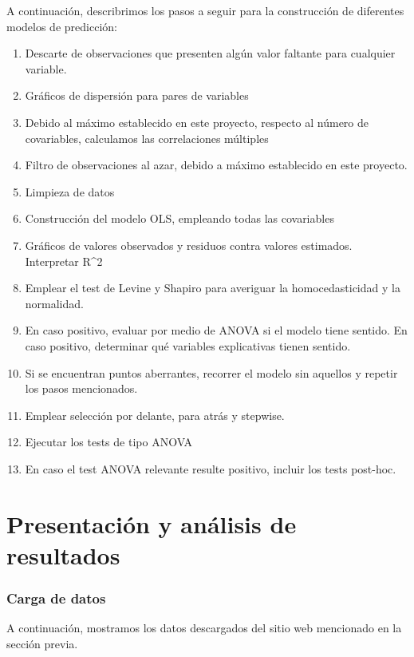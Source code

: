 \documentclass[
]{article}
\begin{document}
A continuación, describrimos los pasos a seguir para la construcción de
diferentes modelos de predicción:

\begin{enumerate}
\def\labelenumi{\arabic{enumi}.}
\item
  Descarte de observaciones que presenten algún valor faltante para
  cualquier variable.
\item
  Gráficos de dispersión para pares de variables
\item
  Debido al máximo establecido en este proyecto, respecto al número de
  covariables, calculamos las correlaciones múltiples
\item
  Filtro de observaciones al azar, debido a máximo establecido en este
  proyecto.
\item
  Limpieza de datos
\item
  Construcción del modelo OLS, empleando todas las covariables
\item
  Gráficos de valores observados y residuos contra valores estimados.
  Interpretar R\^{}2
\item
  Emplear el test de Levine y Shapiro para averiguar la homocedasticidad
  y la normalidad.
\item
  En caso positivo, evaluar por medio de ANOVA si el modelo tiene
  sentido. En caso positivo, determinar qué variables explicativas
  tienen sentido.
\item
  Si se encuentran puntos aberrantes, recorrer el modelo sin aquellos y
  repetir los pasos mencionados.
\item
  Emplear selección por delante, para atrás y stepwise.
\item
  Ejecutar los tests de tipo ANOVA
\item
  En caso el test ANOVA relevante resulte positivo, incluir los tests
  post-hoc.
\end{enumerate}

\section{Presentación y análisis de resultados}

\subsubsection{Carga de datos}\label{carga-de-datos}

A continuación, mostramos los datos descargados del sitio web mencionado
en la sección previa.
\end{document}
